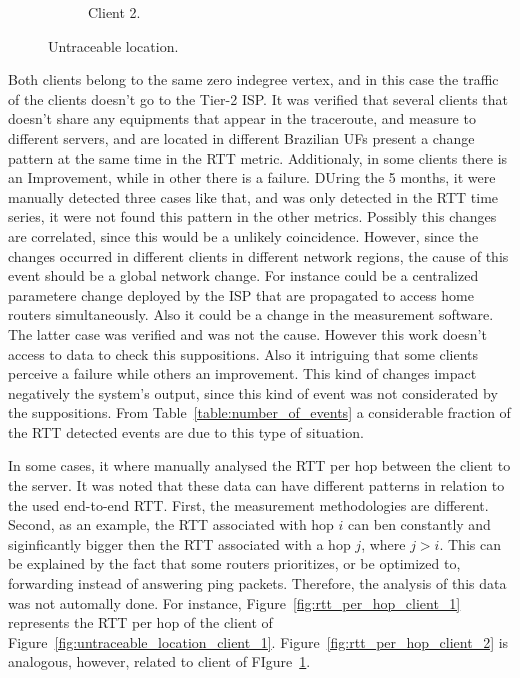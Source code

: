 \begin{figure}[H]
{\begin{subfigure}[b]{0.5\textwidth}
            \caption{Client 2.}\label{fig:untraceable_location_client_2}
        \end{subfigure}%
    }
    \caption{Untraceable location.}
\label{fig:untraceable_location}
\end{figure}%

Both clients belong to the same zero indegree vertex,
and in this case the traffic of the clients doesn't go to the Tier-2 ISP.
It was verified that several clients that doesn't share any equipments that
appear in the traceroute, and measure to different servers, and are located in
different Brazilian UFs present a change pattern at the same time in the RTT
metric. Additionaly, in some clients there is an Improvement, while in other
there is a failure. DUring the 5 months, it were manually detected three cases
like that, and was only detected in the RTT time series, it were not found this
pattern in the other metrics. Possibly this changes are correlated, since
this would be a unlikely coincidence. However, since the changes occurred in
different clients in different network regions, the cause of this event should
be a global network change. For instance could be a centralized parametere
change deployed by the ISP that are propagated to access home routers
simultaneously. Also it could be a change in the measurement software. The
latter case was verified and was not the cause. However this work doesn't
access to data to check this suppositions. Also it intriguing that some clients
perceive a failure while others an improvement. This kind of changes impact
negatively the system's output, since this kind of event was not considerated
by the suppositions. From Table~\ref{table:number_of_events} a considerable
fraction of the RTT detected events are due to this type of situation.

In some cases, it where manually analysed the RTT per hop between the client to
the server. It was noted that these data can have different patterns in
relation to the used end-to-end RTT. First, the measurement methodologies are
different. Second, as an example, the RTT associated with hop $i$ can ben
constantly and siginficantly bigger then the RTT associated with a hop $j$,
where $j > i$. This can be explained by the fact that some routers prioritizes,
or be optimized to,
forwarding instead of answering ping packets. Therefore, the analysis of this
data was not automally done. For instance, Figure~\ref{fig:rtt_per_hop_client_1}
represents the RTT per hop of the client of
Figure~\ref{fig:untraceable_location_client_1}.
Figure~\ref{fig:rtt_per_hop_client_2} is analogous, however, related to client
of FIgure~\ref{fig:untraceable_location_client_2}.

